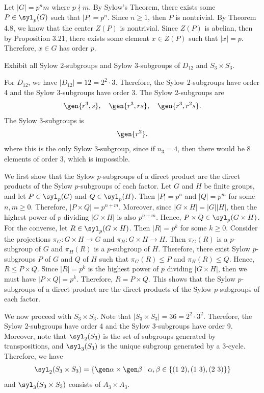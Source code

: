 \begin{sol}
	Let $|G| = p^n m$ where $p \nmid m$. By Sylow's Theorem, there exists some $P \in \syl_p(G)$ such that $|P| = p^n$. Since $n \geq 1$, then $P$ is nontrivial. By Theorem 4.8, we know that the center $Z(P)$ is nontrivial. Since $Z(P)$ is abelian, then by Proposition 3.21, there exists some element $x \in Z(P)$ such that $|x| = p$. Therefore, $x \in G$ has order $p$.
\end{sol}

\begin{exercise}\label{ex4.5.4}
	Exhibit all Sylow 2-subgroups and Sylow 3-subgroups of $D_{12}$ and $S_3 \times S_3$.
\end{exercise}

\begin{sol}
	For $D_{12}$, we have $|D_{12}| = 12 = 2^2 \cdot 3$. Therefore, the Sylow 2-subgroups have order 4 and the Sylow 3-subgroups have order 3. The Sylow 2-subgroups are
	\[\gen{r^3, s}, \quad \gen{r^3, rs}, \quad \gen{r^3, r^2s}.\]
	The Sylow 3-subgroups is
	\[\gen{r^2}.\]
	where this is the only Sylow 3-subgroup, since if $n_3 = 4$, then there would be $8$ elements of order $3$, which is impossible.

	We first show that the Sylow $p$-subgroups of a direct product are the direct products of the Sylow $p$-subgroups of each factor. Let $G$ and $H$ be finite groups, and let $P \in \syl_p(G)$ and $Q \in \syl_p(H)$. Then $|P| = p^n$ and $|Q| = p^m$ for some $n, m \geq 0$. Therefore, $|P \times Q| = p^{n + m}$. Moreover, since $|G \times H| = |G||H|$, then the highest power of $p$ dividing $|G \times H|$ is also $p^{n + m}$. Hence, $P \times Q \in \syl_p(G \times H)$. For the converse, let $R \in \syl_p(G \times H)$. Then $|R| = p^k$ for some $k \geq 0$. Consider the projections $\pi_G : G \times H \to G$ and $\pi_H : G \times H \to H$. Then $\pi_G(R)$ is a $p$-subgroup of $G$ and $\pi_H(R)$ is a $p$-subgroup of $H$. Therefore, there exist Sylow $p$-subgroups $P$ of $G$ and $Q$ of $H$ such that $\pi_G(R) \leq P$ and $\pi_H(R) \leq Q$. Hence, $R \leq P \times Q$. Since $|R| = p^k$ is the highest power of $p$ dividing $|G \times H|$, then we must have $|P \times Q| = p^k$. Therefore, $R = P \times Q$. This shows that the Sylow $p$-subgroups of a direct product are the direct products of the Sylow $p$-subgroups of each factor.

	We now proceed with $S_3 \times S_3$. Note that $|S_3 \times S_3| = 36 = 2^2 \cdot 3^2$. Therefore, the Sylow 2-subgroups have order 4 and the Sylow 3-subgroups have order 9. Moreover, note that $\syl_2(S_3)$ is the set of subgroups generated by transpositions, and $\syl_3(S_3)$ is the unique subgroup generated by a 3-cycle. Therefore, we have
	\[\syl_2(S_3 \times S_3) = \{\gen\alpha \times \gen\beta \mid \alpha, \beta \in \{(1\ 2), (1\ 3), (2\ 3)\}\}\]
	and $\syl_3(S_3 \times S_3)$ consists of $A_3 \times A_3$.
\end{sol}

